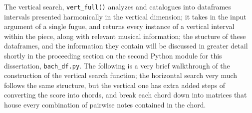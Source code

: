 The vertical search, \texttt{vert\_full()} analyzes and catalogues into
dataframes intervals presented harmonically in the vertical dimension;
it takes in the input argument of a single fugue, and returns every
instance of a vertical interval within the piece, along with relevant
musical information; the stucture of these dataframes, and the
information they contain will be discussed in greater detail shortly in
the proceeding section on the second Python module for this
dissertation, \texttt{bach\_df.py}. The following is a very brief
walkthrough of the construction of the vertical search function; the
horizontal search very much follows the same structure, but the vertical
one has extra added steps of converting the score into chords, and break
each chord down into matrices that house every combination of pairwise
notes contained in the chord.

